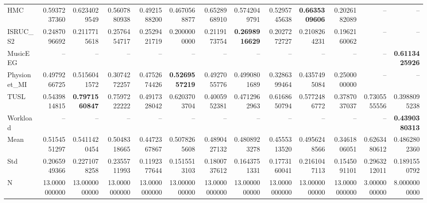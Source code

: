 \begin{table}[htbp]
\begin{tabular}{lrrrrrrrrrrrr}
HMC & 0.5937237360 & 0.6234029549 & 0.5607880938 & 0.4921588200 & 0.4670568877 & 0.6528968910 & 0.5742049791 & 0.5295745638 & \bfseries 0.6635309606 & 0.2026182089 & -- & -- \\
ISRUC_S2 & 0.2487096692 & 0.2117715618 & 0.2576454717 & 0.2529421719 & 0.2000000000 & 0.2119173754 & \bfseries 0.2698916629 & 0.2027272727 & 0.2108264231 & 0.1962160062 & -- & -- \\
MusicEEG & -- & -- & -- & -- & -- & -- & -- & -- & -- & -- & -- & \bfseries 0.6113425926 \\
Physionet_MI & 0.4979266725 & 0.5156041572 & 0.3074272257 & 0.4752674426 & \bfseries 0.5269557219 & 0.4927055776 & 0.4990801689 & 0.3286399464 & 0.4357495084 & 0.2500000000 & -- & -- \\
TUSL & 0.5439814815 & \bfseries 0.7971560847 & 0.7597222222 & 0.4917328042 & 0.6203703704 & 0.4005952381 & 0.4712962963 & 0.6168650794 & 0.5772486772 & 0.3787037037 & 0.7305555556 & 0.3988095238 \\
Workload & -- & -- & -- & -- & -- & -- & -- & -- & -- & -- & -- & \bfseries 0.4390380313 \\
Mean & 0.5154551297 & 0.5411420454 & 0.5048318665 & 0.4472367867 & 0.5078265608 & 0.4890427132 & 0.4808923278 & 0.4555313520 & 0.4956248566 & 0.3461806051 & 0.6263480612 & 0.4862802360 \\
Std & 0.2065949366 & 0.2271078258 & 0.2355711993 & 0.1192377644 & 0.1515513103 & 0.1800737612 & 0.1643751331 & 0.1773160041 & 0.2161047113 & 0.1545091101 & 0.2963212011 & 0.1891550792 \\
N & 13.0000000000 & 13.0000000000 & 13.0000000000 & 13.0000000000 & 13.0000000000 & 13.0000000000 & 13.0000000000 & 13.0000000000 & 13.0000000000 & 13.0000000000 & 3.0000000000 & 8.0000000000 \\
\bottomrule
\end{tabular}
\end{table}
